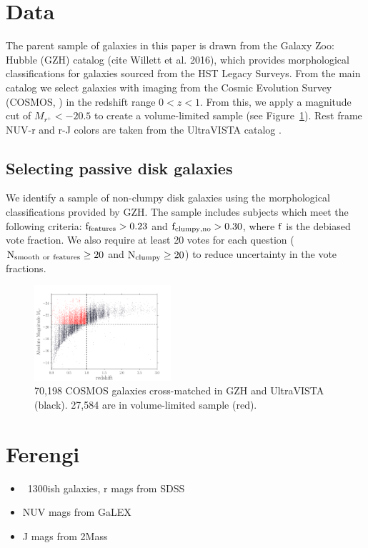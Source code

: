 \documentclass[useAMS,usenatbib]{mn2e}
\begin{document}
\section{Data}
\label{sec:Data}

The parent sample of galaxies in this paper is drawn from the Galaxy Zoo: Hubble (GZH) catalog (cite Willett et al. 2016), which provides morphological classifications for galaxies sourced from the HST Legacy Surveys. From the main catalog we select galaxies with imaging from the Cosmic Evolution Survey (COSMOS, \citet{Scoville2007}) in the redshift range $0<z<1$. From this, we apply a magnitude cut of $M_{r^{+}}<-20.5$ to create a volume-limited sample (see Figure~\ref{fig:volume_lim}). Rest frame NUV-r and r-J colors are taken from the UltraVISTA catalog \citep{McCracken2012,Ilbert2013}.

\subsection{Selecting passive disk galaxies}
We identify a sample of non-clumpy disk galaxies using the morphological classifications provided by GZH. The sample includes subjects which meet the following criteria: $\rm f_{features} > 0.23$ and $\rm f_{clumpy,no} > 0.30$, where $\rm f$ is the debiased vote fraction. We also require at least 20 votes for each question ($\rm N_{smooth~or~features} \ge 20$ and $\rm N_{clumpy} \ge 20$) to reduce uncertainty in the vote fractions. 

\begin{figure}
\centering
\includegraphics[width=0.45\textwidth]{figures/mag_z_limit.pdf}
\caption{70,198 COSMOS galaxies cross-matched in GZH and UltraVISTA (black). 27,584 are in volume-limited sample (red).}
\label{fig:volume_lim}
\end{figure}   

\section{Ferengi}
\begin{itemize}
\item ~1300ish galaxies, r mags from SDSS \citep{Abazajian2009}
\item NUV mags from GaLEX \citep{Martin2005}
\item J mags from 2Mass \citep{Skrutskie2006}
\end{itemize}
\end{document}
